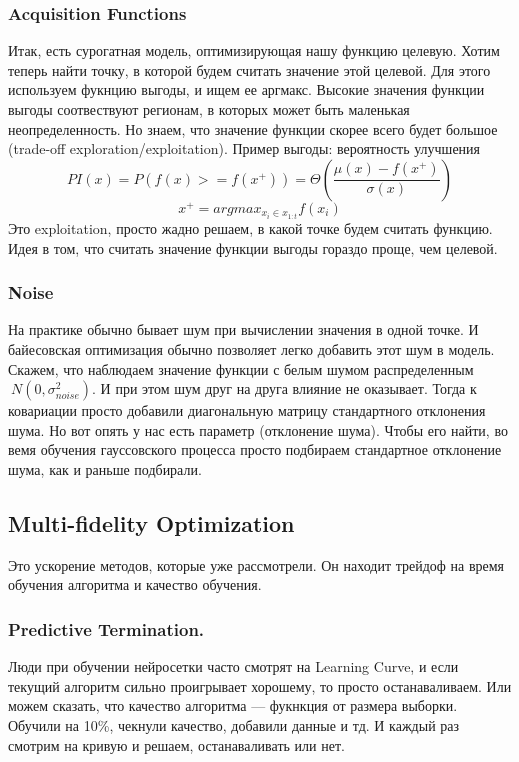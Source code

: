 \documentclass[12pt]{article}
\begin{document}
\subsubsection{Acquisition Functions}
Итак, есть сурогатная модель, оптимизирующая нашу функцию целевую. Хотим теперь найти точку, в которой будем считать значение этой целевой. Для этого используем фукнцию выгоды, и ищем ее аргмакс. Высокие значения функции выгоды соотвествуют регионам, в которых может быть маленькая неопределенность. Но знаем, что значение функции скорее всего будет большое (trade-off exploration/exploitation). Пример выгоды: вероятность улучшения
$$PI(x) = P(f(x) >= f(x^+)) = \Theta(\frac{\mu(x) - f(x^+)}{\sigma(x)})$$
$$x^+=argmax_{x_i\in x_{1:t}}f(x_i)$$
Это exploitation, просто жадно решаем, в какой точке будем считать функцию. Идея в том, что считать значение функции выгоды гораздо проще, чем целевой. 

\subsubsection{Noise}
На практике обычно бывает шум при вычислении значения в одной точке. И байесовская оптимизация обычно позволяет легко добавить этот шум в модель. Скажем, что наблюдаем значение функции с белым шумом распределенным $~\textit{N}(0, \sigma_{noise}^2)$. И при этом шум друг на друга влияние не оказывает. Тогда к ковариации просто добавили диагональную матрицу стандартного отклонения шума. Но вот опять у нас есть параметр (отклонение шума). Чтобы его найти, во вемя обучения гауссовского процесса просто подбираем стандартное отклонение шума, как и раньше подбирали.

\subsection{Multi-fidelity Optimization}
Это ускорение методов, которые уже рассмотрели. Он находит трейдоф на время обучения алгоритма и качество обучения. 

\subsubsection{Predictive Termination.}
Люди при обучении нейросетки часто смотрят на Learning Curve, и если текущий алгоритм сильно проигрывает хорошему, то просто останаваливаем. Или можем сказать, что качество алгоритма --- фукнкция от размера выборки. Обучили на 10\%, чекнули качество, добавили данные и тд. И каждый раз смотрим на кривую и решаем, останаваливать или нет.
\end{document}
